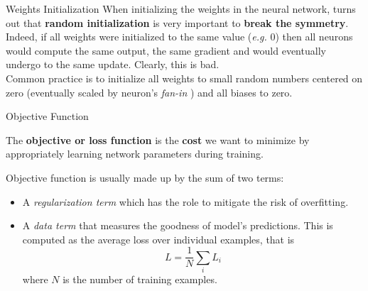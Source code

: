 \documentclass[aspectratio=169]{beamer}
\begin{document}

\begin{frame}{Weights Initialization}
When initializing the weights in the neural network, turns out that \textbf{random initialization} is very important to \textbf{break the symmetry}.\\
\vspace{0.2cm}
Indeed, if all weights were initialized to the same value (\emph{e.g.} $0$) then all neurons would compute the same output, the same gradient and would eventually undergo to the same update. Clearly, this is bad.\\
\vspace{0.2cm}
Common practice is to initialize all weights to small random numbers centered on zero (eventually scaled by neuron's \emph{fan-in} \cite{glorot2010understanding,he2015delving}) and all biases to zero.
\end{frame}


\begin{frame}{Objective Function}

The \textbf{objective or loss function} is the \textbf{cost} we want to minimize by appropriately learning network parameters during training.

Objective function is usually made up by the sum of two terms:
\begin{itemize}
\item A \emph{regularization term} which has the role to mitigate the risk of overfitting.
\item A \emph{data term} that measures the goodness of model's predictions. This is computed as the average loss over individual examples, that is $$L=\frac{1}{N} \sum_i L_i$$ where $N$ is the number of training examples.
\end{itemize}
\end{frame}

\end{document}
